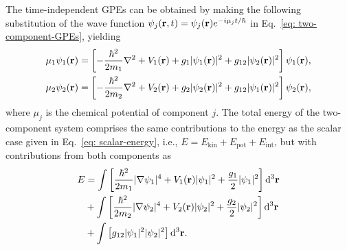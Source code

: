 The time-independent GPEs can be obtained by making the following substitution
of the wave function \(\psi_j(\vb{r}, t)=\psi_j(\vb{r})e^{-i\mu_j t/\hbar}\) in
Eq.~\eqref{eq: two-component-GPEs}, yielding
\begin{equation}\label{eq: time-indep-two-component-GPEs}
    \begin{aligned}
        \mu_1\psi_1(\vb{r}) & =
        \left[-\frac{\hbar^2}{2m_1}\nabla^2 + V_1(\vb{r})
            + g_1|\psi_1(\vb{r})|^2
        + g_{12}|\psi_2(\vb{r})|^2\right]\psi_1(\vb{r}), \\
        \mu_2\psi_2(\vb{r}) & =
        \left[-\frac{\hbar^2}{2m_2}\nabla^2 + V_2(\vb{r})
            + g_2|\psi_2(\vb{r})|^2
            + g_{12}|\psi_1(\vb{r})|^2\right]\psi_2(\vb{r}),
    \end{aligned}
\end{equation}
where \(\mu_j\) is the chemical potential of component \(j\).
The total energy of the two-component system comprises the same contributions to
the energy as the scalar case given in Eq.~\eqref{eq: scalar-energy}, i.e.,
\(E = E_\text{kin} + E_\text{pot} + E_\text{int}\), but with contributions from
both components as
\begin{equation}
    \begin{aligned}
        E & = \int \left[\frac{\hbar^2}{2m_1}|\nabla\psi_1|^4
        + V_1(\vb{r})|\psi_1|^2 + \frac{g_1}{2}|\psi_1|^2 \right] \dd^3\vb{r} \\
          & + \int \left[\frac{\hbar^2}{2m_2}|\nabla\psi_2|^4
        + V_2(\vb{r})|\psi_2|^2 + \frac{g_2}{2}|\psi_2|^2 \right] \dd^3\vb{r} \\
          & + \int \left[g_{12}|\psi_1|^2|\psi_2|^2\right] \dd^3\vb{r}.
    \end{aligned}
\end{equation}

